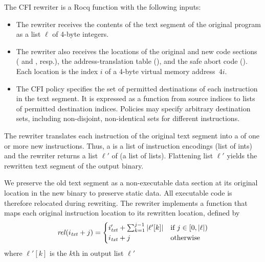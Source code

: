 The CFI rewriter is a Rocq function with the following inputs:
\begin{itemize}[topsep=1ex,itemsep=-1ex,partopsep=1ex,parsep=1ex, leftmargin=*]
\item {}
The rewriter receives the contents of the text segment of the original program as a list $\ell$ of 4-byte integers.
\item {}
The rewriter also receives the locations of the original and new code sections (\bi{} and \bip, resp.), the address-translation table (\tbi), and the safe abort code (\mai).
Each location is the index $i$ of a 4-byte virtual memory address~$4i$.
\item {}
The CFI policy specifies the set of permitted destinations of each instruction in the text segment.
It is expressed as a function from source indices to lists of permitted destination indices.
Policies may specify arbitrary destination sets, including non-disjoint, non-identical sets for different instructions.
\end{itemize}

The rewriter translates each instruction of the original text segment into a \emph{\Block} of one or more new instructions.
Thus, a \Block is a list of instruction encodings (list of ints) and the rewriter returns a list $\ell'$ of \Blocks (\ie a list of lists).
Flattening list $\ell'$ yields the rewritten text segment of the output binary.

We preserve the old text segment as a non-executable data section at its original location in the new binary to preserve static data.
All executable code is therefore relocated during rewriting.
The rewriter implements a function \itoip that maps each original instruction location to its rewritten \Block location, defined by
\begin{equation}\label{eq:itoip}
\mathit{rel}(i_\mathit{txt}+j) = \begin{cases} i'_\mathit{txt}+\sum_{k=1}^{j-1} \left|\ell'[k]\right| & \text{if $j\in[0,|\ell|)$} \\
                              i_\mathit{txt}+j & \text{otherwise} \end{cases}
\end{equation}
where $\ell'[k]$ is the $k$th \Block in output list $\ell'$

